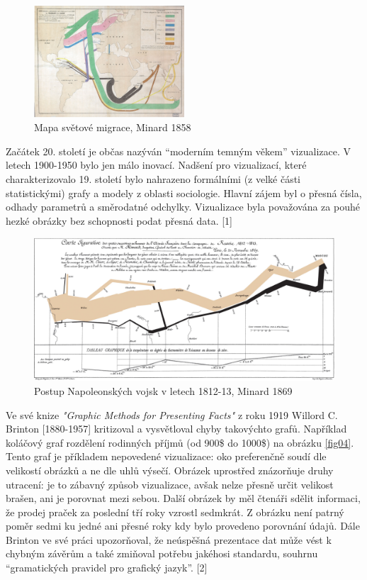 \documentclass[12pt,]{article}
\begin{document}
\begin{figure}
    \centering
    \vspace*{-20pt}
    \includegraphics[width=0.5\textwidth]{fig/minard_flow_map.jpg}
    \vspace{-5pt}
    \caption{Mapa světové migrace, Minard 1858}
    \label{fig02}
\end{figure}

\vspace{2.5pt} \qquad Začátek 20. století je občas nazýván
\enquote{moderním temným věkem} vizualizace. V letech 1900-1950 bylo jen
málo inovací. Nadšení pro vizualizací, které charakterizovalo 19.
století bylo nahrazeno formálními (z velké části statistickými) grafy a
modely z oblasti sociologie. Hlavní zájem byl o přesná čísla, odhady
parametrů a směrodatné odchylky. Vizualizace byla považována za pouhé
hezké obrázky bez schopnosti podat přesná data. {[}1{]}

\begin{figure}[H]
\centering
\includegraphics[width = \textwidth]{fig/Minard_1869}
\caption{Postup Napoleonských vojsk v letech 1812-13, Minard 1869}
\label{fig03}
\end{figure}

\qquad Ve své knize \textit{"Graphic Methods for Presenting Facts"} z
roku 1919 Willord C. Brinton {[}1880-1957{]} kritizoval a vysvětloval
chyby takovýchto grafů. Například koláčový graf rozdělení rodinných
příjmů (od 900\$ do 1000\$) na obrázku \ref{fig04}. Tento graf je
příkladem nepovedené vizualizace: oko preferenčně soudí dle velikostí
obrázků a ne dle uhlů výsečí. Obrázek uprostřed znázorňuje druhy
utracení: je to zábavný způsob vizualizace, avšak nelze přesně určit
velikost brašen, ani je porovnat mezi sebou. Další obrázek by měl
čtenáři sdělit informaci, že prodej praček za poslední tří roky vzrostl
sedmkrát. Z obrázku není patrný poměr sedmi ku jedné ani přesné roky kdy
bylo provedeno porovnání údajů. Dále Brinton ve své práci upozorňoval,
že neúspěšná prezentace dat může vést k chybným závěrům a také zmiňoval
potřebu jakéhosi standardu, souhrnu \enquote{gramatických pravidel pro
grafický jazyk}. {[}2{]}
\end{document}
